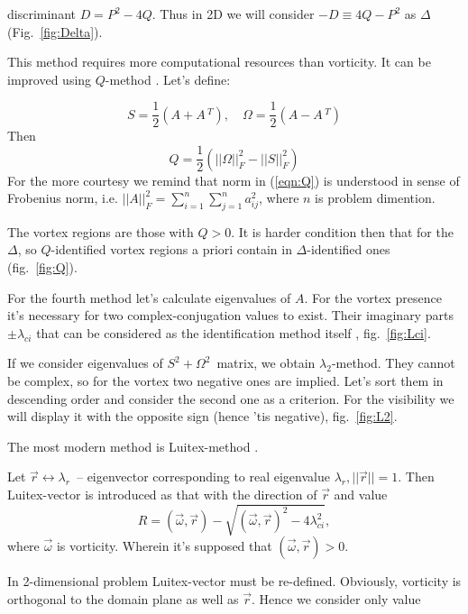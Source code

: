 \documentclass[a4wide,fontsize=12pt]{article}
\begin{document}
discriminant $D=P^2-4Q$. Thus in 2D we will consider $-D\equiv 4Q-P^2$ as $\Delta$ (Fig.~\ref{fig:Delta}).

This method requires more computational resources than vorticity. It can be improved using $Q$-method \cite{vortex}\cite{Hussain}. Let's define:

\begin{equation}
 S=\frac{1}{2}\left(A +A\,^T \right) ,\quad \Omega=\frac{1}{2} \left( A - A\,^T\right) 
  \label{NSdim}
\end{equation}
Then
\begin{equation}
  Q=\frac{1}{2} \left( ||\Omega||^2_F-||S||^2_F \right) 
  \label{eqn:Q}
 \end{equation}
For the more courtesy we remind that norm in (\ref{eqn:Q}) is understood in sense of Frobenius norm, i.e. $||A||^2_F=\sum \limits_{i=1}^n \sum \limits_{j=1}^n a_{ij}^2$, where $n$ is problem dimention.

The vortex regions are those with $Q>0$. It is harder condition then that for the $\Delta$, so $Q$-identified vortex regions a priori contain in $\Delta$-identified ones (fig.~\ref{fig:Q}).

For the fourth method let's calculate eigenvalues of $A$. For the vortex presence it's necessary for two complex-conjugation values to exist. Their imaginary parts $\pm\lambda_{ci}$ that can be considered as the identification method itself \cite{vortex}, fig.~\ref{fig:Lci}.

If we consider eigenvalues of $S^2+\Omega^2$~matrix, we obtain $\lambda_2$-method. They cannot be complex, so for the vortex two negative ones are implied. Let's sort them in descending order and consider the second one as a criterion\cite{vortex,Hussain}. For the visibility we will display it with the opposite sign (hence 'tis negative), fig.~\ref{fig:L2}.

The most modern method is Luitex-method \cite{vortex}.

Let $\vec r \longleftrightarrow \lambda_r$~-- eigenvector corresponding to real eigenvalue $\lambda_r, ||\vec r||=1$. Then Luitex-vector is introduced as that with the direction of $\vec r$ and value
 $$R=(\vec \omega,\vec r)-\sqrt{(\vec \omega,\vec r)^2-4\lambda_{ci}^2},$$\noindent where $\vec \omega$ is vorticity. Wherein it's supposed that $(\vec \omega,\vec r)>0$.
 
 In 2-dimensional problem Luitex-vector must be re-defined. Obviously, vorticity is orthogonal to the domain plane as well as $\vec r$. Hence we consider only value
 
\end{document}
